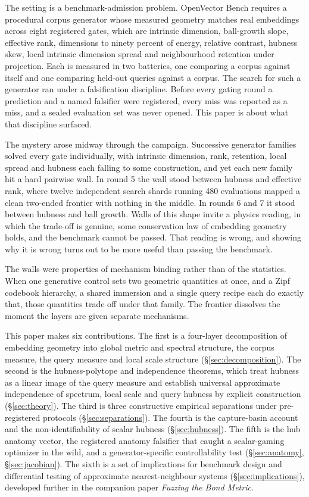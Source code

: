\documentclass[11pt]{article}
\begin{document}
The setting is a benchmark-admission problem. OpenVector Bench requires a
procedural corpus generator whose measured geometry matches real embeddings
across eight registered gates, which are intrinsic dimension, ball-growth
slope, effective rank, dimensions to ninety percent of energy, relative
contrast, hubness skew, local intrinsic dimension spread and neighbourhood
retention under projection. Each is measured in two batteries, one comparing
a corpus against itself and one comparing held-out queries against a corpus.
The search for such a generator ran under a falsification discipline. Before
every gating round a prediction and a named falsifier were registered, every
miss was reported as a miss, and a sealed evaluation set was never opened.
This paper is about what that discipline surfaced.

The mystery arose midway through the campaign. Successive generator families
solved every gate individually, with intrinsic dimension, rank, retention,
local spread and hubness each falling to some construction, and yet each new
family hit a hard pairwise wall. In round 5 the wall stood between hubness
and effective rank, where twelve independent search shards running 480
evaluations mapped a clean two-ended frontier with nothing in the middle. In
rounds 6 and 7 it stood between hubness and ball growth. Walls of this shape
invite a physics reading, in which the trade-off is genuine, some
conservation law of embedding geometry holds, and the benchmark cannot be
passed. That reading is wrong, and showing why it is wrong turns out to be
more useful than passing the benchmark.

The walls were properties of mechanism binding rather than of the statistics.
When one generative control sets two geometric quantities at once, and a Zipf
codebook hierarchy, a shared immersion and a single query recipe each do
exactly that, those quantities trade off under that family. The frontier
dissolves the moment the layers are given separate mechanisms.

This paper makes six contributions. The first is a four-layer decomposition of
embedding geometry into global metric and spectral structure, the corpus
measure, the query measure and local scale structure
(\S\ref{sec:decomposition}). The second is the hubness-polytope and
independence theorems, which treat hubness as a linear image of the query
measure and establish universal approximate independence of spectrum, local
scale and query hubness by explicit construction (\S\ref{sec:theory}). The
third is three constructive empirical separations under pre-registered
protocols (\S\ref{sec:separations}). The fourth is the capture-basin account
and the non-identifiability of scalar hubness (\S\ref{sec:hubness}). The
fifth is the hub anatomy vector, the registered anatomy falsifier that caught
a scalar-gaming optimizer in the wild, and a generator-specific
controllability test (\S\ref{sec:anatomy}, \S\ref{sec:jacobian}). The sixth is
a set of implications for benchmark design and differential testing of
approximate nearest-neighbour systems (\S\ref{sec:implications}), developed
further in the companion paper \emph{Fuzzing the Bond Metric}.
\end{document}
